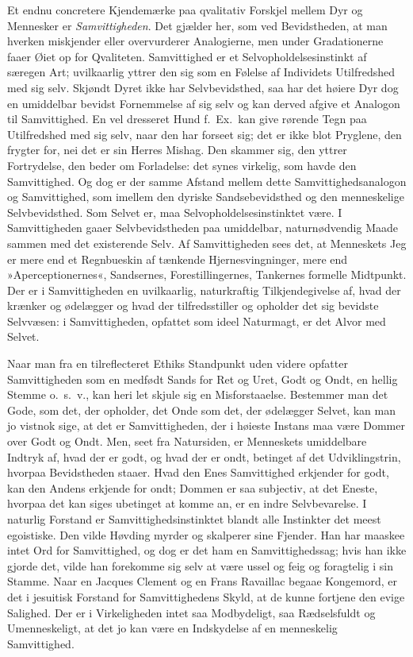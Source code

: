 \documentclass[12pt]{book}
\newcommand{\apage}[1]{\marginnote{\footnotesize\textit{[#1]}}}
\begin{document}
Et endnu concretere Kjendemærke paa qvalitativ Forskjel mellem Dyr og
Mennesker er \emph{Samvittigheden}. Det gjælder her, som ved Bevidstheden, at man
hverken miskjender eller overvurderer Analogierne, men under Gradationerne
faaer Øiet op for Qvaliteten. Samvittighed er et Selvopholdelsesinstinkt af
særegen Art; uvilkaarlig yttrer den sig som en Følelse af  \apage{212} Individets
Utilfredshed med sig selv. Skjøndt Dyret ikke har Selvbevidsthed, saa har
det høiere Dyr dog en umiddelbar bevidst Fornemmelse af sig selv og kan
derved afgive et Analogon til Samvittighed. En vel dresseret Hund f.\ Ex.\
kan give rørende Tegn paa Utilfredshed med sig selv, naar den har forseet
sig; det er ikke blot Pryglene, den frygter for, nei det er sin Herres
Mishag. Den skammer sig, den yttrer Fortrydelse, den beder om Forladelse:
det synes virkelig, som havde den Samvittighed. Og dog er der samme Afstand
mellem dette Samvittighedsanalogon og Samvittighed, som imellem den dyriske
Sandsebevidsthed og den menneskelige Selvbevidsthed. Som Selvet er, maa
Selvopholdelsesinstinktet være. I Samvittigheden gaaer Selvbevidstheden paa
umiddelbar, naturnødvendig Maade sammen med det existerende Selv. Af
Samvittigheden sees det, at Menneskets Jeg er mere end et Regnbueskin af
tænkende Hjernesvingninger, mere end »Aperceptionernes«, Sandsernes,
Forestillingernes, Tankernes formelle Midtpunkt. Der er i Samvittigheden en
uvilkaarlig, naturkraftig Tilkjendegivelse af, hvad der krænker og
ødelægger og hvad der tilfredsstiller og opholder det sig bevidste
Selvvæsen: i Samvittigheden, opfattet som ideel Naturmagt, er det Alvor med
Selvet.

Naar man fra en tilreflecteret Ethiks Standpunkt uden videre opfatter
Samvittigheden som en medfødt Sands for Ret og Uret, Godt og Ondt, en
hellig Stemme o.\ s.\ v., kan heri let skjule sig en Misforstaaelse. Bestemmer
man det Gode, som det, der opholder, det Onde som det, der ødelægger Selvet,
kan man jo \apage{213} vistnok sige, at det er Samvittigheden, der i høieste Instans maa
være Dommer over Godt og Ondt. Men, seet fra Natursiden, er Menneskets
umiddelbare Indtryk af, hvad der er godt, og hvad der er ondt, betinget af
det Udviklingstrin, hvorpaa Bevidstheden staaer. Hvad den Enes Samvittighed
erkjender for godt, kan den Andens erkjende for ondt; Dommen er saa
subjectiv, at det Eneste, hvorpaa det kan siges ubetinget at komme an, er
en indre Selvbevarelse. I naturlig Forstand er Samvittighedsinstinktet
blandt alle Instinkter det meest egoistiske. Den vilde Høvding myrder og
skalperer sine Fjender. Han har maaskee intet Ord for Samvittighed, og dog
er det ham en Samvittighedssag; hvis han ikke gjorde det, vilde han
forekomme sig selv at være ussel og feig og foragtelig i sin Stamme. Naar
en Jacques Clement og en Frans Ravaillac begaae Kongemord, er det i
jesuitisk Forstand for Samvittighedens Skyld, at de kunne fortjene den
evige Salighed. Der er i Virkeligheden intet saa Modbydeligt, saa
Rædselsfuldt og Umenneskeligt, at det jo kan være en Indskydelse af en
menneskelig Samvittighed.
\end{document}
